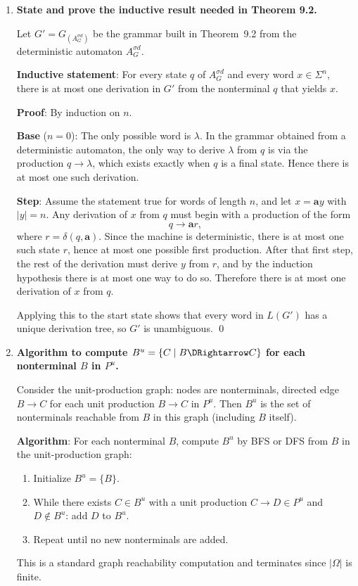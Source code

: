 \begin{enumerate}[{9.}1. ]
\begin{enumerate}
\item No.  Since there are unambiguous context-free languages whose union is not
unambiguous, \USIG\ is not closed under union.
\end{enumerate}

\item \textbf{State and prove the inductive result needed in Theorem 9.2.}

Let $G'=G_{(A_G^{\sigma d})}$ be the grammar built in Theorem~9.2 from the
deterministic automaton $A_G^{\sigma d}$.

\textbf{Inductive statement}: For every state $q$ of $A_G^{\sigma d}$ and every
word $x\in\Sigma^n$, there is at most one derivation in $G'$ from the
nonterminal $q$ that yields $x$.

\textbf{Proof}: By induction on $n$.

\textbf{Base} ($n=0$): The only possible word is $\lambda$.  In the grammar
obtained from a deterministic automaton, the only way to derive $\lambda$ from
$q$ is via the production $q\to\lambda$, which exists exactly when $q$ is a
final state.  Hence there is at most one such derivation.

\textbf{Step}: Assume the statement true for words of length $n$, and let
$x=\pmb{a}y$ with $|y|=n$.  Any derivation of $x$ from $q$ must begin with a
production of the form
\[
q\to \pmb{a}r,
\]
where $r=\delta(q,\pmb{a})$.  Since the machine is deterministic, there is at
most one such state $r$, hence at most one possible first production.  After
that first step, the rest of the derivation must derive $y$ from $r$, and by
the induction hypothesis there is at most one way to do so.  Therefore there is
at most one derivation of $x$ from $q$.

Applying this to the start state shows that every word in $L(G')$ has a unique
derivation tree, so $G'$ is unambiguous. \qed

\item \textbf{Algorithm to compute $B^u = \{C \mid B \DRightarrow C\}$ for each nonterminal $B$ in $P^u$.}

Consider the unit-production graph: nodes are nonterminals, directed edge $B \to C$ for each unit production $B \to C$ in $P^u$. Then $B^u$ is the set of nonterminals reachable from $B$ in this graph (including $B$ itself).

\textbf{Algorithm}: For each nonterminal $B$, compute $B^u$ by BFS or DFS from $B$ in the unit-production graph:
\begin{enumerate}
\item Initialize $B^u = \{B\}$.
\item While there exists $C \in B^u$ with a unit production $C \to D \in P^u$ and $D \notin B^u$: add $D$ to $B^u$.
\item Repeat until no new nonterminals are added.
\end{enumerate}
This is a standard graph reachability computation and terminates since $|\Omega|$ is finite.


\end{enumerate}
